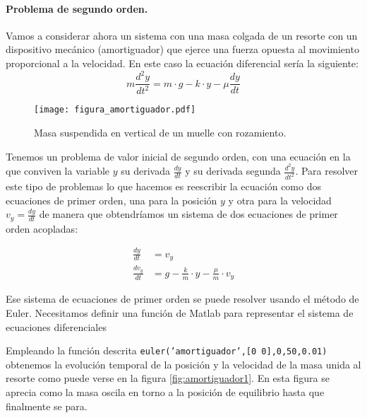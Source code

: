 \paragraph{Problema de segundo orden.} Vamos a considerar ahora un sistema con una masa colgada de un resorte con un dispositivo mecánico (amortiguador) que ejerce una fuerza opuesta al movimiento proporcional a la velocidad. En este caso la ecuación diferencial sería la siguiente:
\begin{equation*}
m\frac{d^2 y}{dt^2}=m\cdot g-k \cdot y-\mu \frac{dy}{dt}
\end{equation*}

\begin{figure}[h]
	\centering
	\texttt{[image: figura\_amortiguador.pdf]}
	\caption{Masa suspendida en vertical de un muelle con rozamiento.}
	\label{fig:masa_suspendida}
\end{figure}

Tenemos un problema de valor inicial de segundo orden, con una ecuación en la que conviven la variable $y$ su derivada $\frac{dy}{dt}$ y su derivada segunda $\frac{d^2y}{dt^2}$. Para resolver este tipo de problemas lo que hacemos es reescribir la ecuación como dos ecuaciones de primer orden, una para la posición $y$ y otra para la velocidad $v_y=\frac{dy}{dt}$ de manera que obtendríamos un sistema de dos ecuaciones de primer orden acopladas:

\begin{align*}
\frac{dy}{dt}&=v_y \\
\frac{dv_y}{dt}&=g-\frac{k}{m}\cdot y - \frac{\mu}{m}\cdot v_y 
\end{align*}

Ese sistema de ecuaciones de primer orden se puede resolver usando el método de Euler. Necesitamos definir una función de Matlab para representar el sistema de ecuaciones diferenciales


Empleando la función descrita \texttt{euler('amortiguador',[0 0],0,50,0.01)} obtenemos la evolución temporal de la posición y la velocidad de la masa unida al resorte como puede verse en la figura \ref{fig:amortiguador1}. En esta figura se aprecia como la masa oscila en torno a la posición de equilibrio hasta que finalmente se para.

